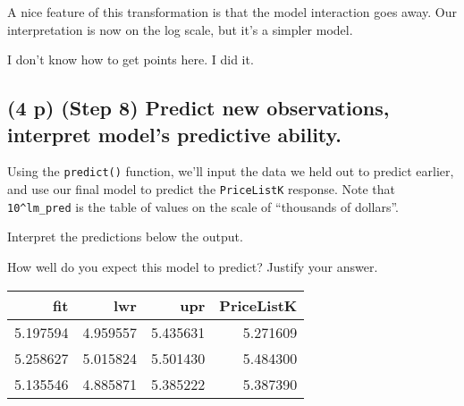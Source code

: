 \documentclass[
  12pt,
]{article}
\newenvironment{Shaded}{\begin{snugshade}}{\end{snugshade}}
\newcommand{\AttributeTok}[1]{\textcolor[rgb]{0.77,0.63,0.00}{#1}}
\newcommand{\CommentTok}[1]{\textcolor[rgb]{0.56,0.35,0.01}{\textit{#1}}}
\newcommand{\FunctionTok}[1]{\textcolor[rgb]{0.00,0.00,0.00}{#1}}
\newcommand{\NormalTok}[1]{#1}
\newcommand{\OtherTok}[1]{\textcolor[rgb]{0.56,0.35,0.01}{#1}}
\newcommand{\SpecialCharTok}[1]{\textcolor[rgb]{0.00,0.00,0.00}{#1}}
\newcommand{\StringTok}[1]{\textcolor[rgb]{0.31,0.60,0.02}{#1}}
\begin{document}
A nice feature of this transformation is that the model interaction goes
away. Our interpretation is now on the log scale, but it's a simpler
model.

I don't know how to get points here. I did it.

\hypertarget{p-step-8-predict-new-observations-interpret-models-predictive-ability.}{%
\subsection{\texorpdfstring{\textbf{(4 p)} (Step 8) Predict new
observations, interpret model's predictive
ability.}{(4 p) (Step 8) Predict new observations, interpret model's predictive ability.}}\label{p-step-8-predict-new-observations-interpret-models-predictive-ability.}}

Using the \texttt{predict()} function, we'll input the data we held out
to predict earlier, and use our final model to predict the
\texttt{PriceListK} response. Note that \texttt{10\^{}lm\_pred} is the
table of values on the scale of ``thousands of dollars''.

Interpret the predictions below the output.

How well do you expect this model to predict? Justify your answer.

\begin{Shaded}
\end{Shaded}

\begin{tabular}{r|r|r|r}
\hline
fit & lwr & upr & PriceListK\\
\hline
5.197594 & 4.959557 & 5.435631 & 5.271609\\
\hline
5.258627 & 5.015824 & 5.501430 & 5.484300\\
\hline
5.135546 & 4.885871 & 5.385222 & 5.387390\\
\hline
\end{tabular}
\end{document}
